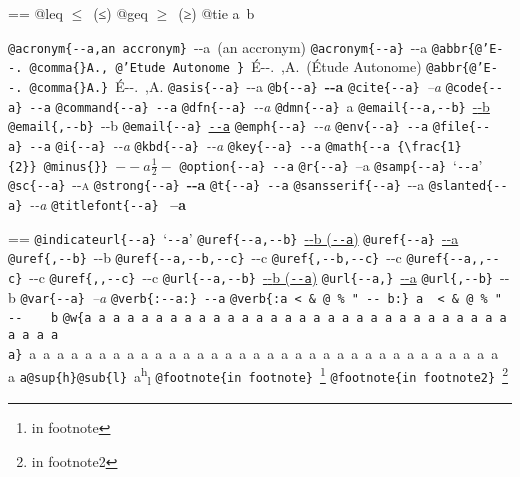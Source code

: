 \documentclass{book}
\makeatletter
\newcommand\Texinfocommandstyletextcite[1]{{\normalfont{}\textsl{#1}}}%
\newcommand\Texinfocommandstyletextkbd[1]{{\ttfamily\textsl{#1}}}%
\newcommand\Texinfocommandstyletextvar[1]{{\normalfont{}\textsl{#1}}}%
\newenvironment{Texinfopreformatted}{%
  \par\GNUTobeylines\obeyspaces\frenchspacing\parskip=\z@\parindent=\z@}{}
{\catcode`\^^M=13 \gdef\GNUTobeylines{\catcode`\^^M=13 \def^^M{\null\par}}}
\newenvironment{Texinfoindented}{\begin{list}{}{}\item\relax}{\end{list}}
\renewcommand{\_}{\Texinfounderscore\discretionary{}{}{}}
\makeatother
\begin{document}
\begin{Texinfoindented}
\begin{Texinfopreformatted}
@leq $\leq{}$\ (≤)
@geq $\geq{}$\ (≥)
@tie a~b

\texttt{@acronym\{{-}{-}a,an accronym\}}\ {-}{-}a\ (an accronym)
\texttt{@acronym\{{-}{-}a\}}\ {-}{-}a
\texttt{@abbr\{@'E{-}{-}.\ @comma\{\}A.,\ @'Etude Autonome \}}\ \'{E}{-}{-}.\@\ ,A.\@\ (\'{E}tude Autonome)
\texttt{@abbr\{@'E{-}{-}.\ @comma\{\}A.\}}\ \'{E}{-}{-}.\@\ ,A.\@
\texttt{@asis\{{-}{-}a\}}\ {-}{-}a
\texttt{@b\{{-}{-}a\}}\ \textbf{{-}{-}a}
\texttt{@cite\{{-}{-}a\}}\ \Texinfocommandstyletextcite{--a}
\texttt{@code\{{-}{-}a\}}\ \texttt{{-}{-}a}
\texttt{@command\{{-}{-}a\}}\ \texttt{{-}{-}a}
\texttt{@dfn\{{-}{-}a\}}\ \textsl{{-}{-}a}
\texttt{@dmn\{{-}{-}a\}}\ \thinspace {-}{-}a
\texttt{@email\{{-}{-}a,{-}{-}b\}}\ \href{mailto:--a}{{-}{-}b}
\texttt{@email\{,{-}{-}b\}}\ {-}{-}b
\texttt{@email\{{-}{-}a\}}\ \href{mailto:--a}{\nolinkurl{--a}}
\texttt{@emph\{{-}{-}a\}}\ \emph{{-}{-}a}
\texttt{@env\{{-}{-}a\}}\ \texttt{{-}{-}a}
\texttt{@file\{{-}{-}a\}}\ \texttt{{-}{-}a}
\texttt{@i\{{-}{-}a\}}\ \textit{{-}{-}a}
\texttt{@kbd\{{-}{-}a\}}\ \Texinfocommandstyletextkbd{{-}{-}a}
\texttt{@key\{{-}{-}a\}}\ \texttt{{-}{-}a}
\texttt{@math\{{-}{-}a \{\textbackslash{}frac\{1\}\{2\}\}\ @minus\{\}\}}\ $--a {\frac{1}{2}} -$
\texttt{@option\{{-}{-}a\}}\ \texttt{{-}{-}a}
\texttt{@r\{{-}{-}a\}}\ \textnormal{--a}
\texttt{@samp\{{-}{-}a\}}\ `\texttt{{-}{-}a}'
\texttt{@sc\{{-}{-}a\}}\ \textsc{{-}{-}a}
\texttt{@strong\{{-}{-}a\}}\ \textbf{{-}{-}a}
\texttt{@t\{{-}{-}a\}}\ \texttt{{-}{-}a}
\texttt{@sansserif\{{-}{-}a\}}\ \textsf{{-}{-}a}
\texttt{@slanted\{{-}{-}a\}}\ \textsl{{-}{-}a}
\texttt{@titlefont\{{-}{-}a\}}\ \end{Texinfopreformatted}
{\huge \bfseries --a}\begin{Texinfopreformatted}%
\ttfamily 
\texttt{@indicateurl\{{-}{-}a\}}\ `\texttt{{-}{-}a}'
\texttt{@uref\{{-}{-}a,{-}{-}b\}}\ \href{--a}{{-}{-}b (\nolinkurl{--a})}
\texttt{@uref\{{-}{-}a\}}\ \url{--a}
\texttt{@uref\{,{-}{-}b\}}\ {-}{-}b
\texttt{@uref\{{-}{-}a,{-}{-}b,{-}{-}c\}}\ {-}{-}c
\texttt{@uref\{,{-}{-}b,{-}{-}c\}}\ {-}{-}c
\texttt{@uref\{{-}{-}a{,}{,}{-}{-}c\}}\ {-}{-}c
\texttt{@uref\{{,}{,}{-}{-}c\}}\ {-}{-}c
\texttt{@url\{{-}{-}a,{-}{-}b\}}\ \href{--a}{{-}{-}b (\nolinkurl{--a})}
\texttt{@url\{{-}{-}a,\}}\ \url{--a}
\texttt{@url\{,{-}{-}b\}}\ {-}{-}b
\texttt{@var\{{-}{-}a\}}\ \Texinfocommandstyletextvar{--a}
\texttt{@verb\{:{-}{-}a:\}}\ \verb:--a:
\texttt{@verb\{:a  < \& @\ \% " {-}{-}    b:\}}\ \verb:a  < & @ % " --    b:
\texttt{@w\{a a a a a a a a a a a a a a a a a a a a a a a a a a a a a a a a a a a\}}\ \hbox{a a a a a a a a a a a a a a a a a a a a a a a a a a a a a a a a a a a}
\texttt{a@sup\{h\}@sub\{l\}}\ a\textsuperscript{h}\textsubscript{l}
\texttt{@footnote\{in footnote\}}\ \footnote{in footnote}
\texttt{@footnote\{in footnote2\}}\ \footnote{in footnote2}


\end{Texinfopreformatted}
\end{Texinfoindented}
\end{document}
